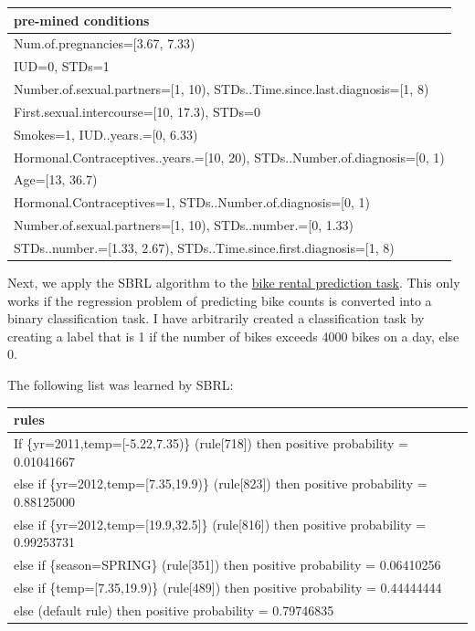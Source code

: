 \documentclass[
  11pt,
]{scrbook}
\begin{document}
\begin{table}
\centering
\begin{tabular}{>{\raggedright\arraybackslash}p{10cm}}
\toprule
pre-mined conditions\\
\midrule
Num.of.pregnancies=[3.67, 7.33)\\
IUD=0, STDs=1\\
Number.of.sexual.partners=[1, 10), STDs..Time.since.last.diagnosis=[1, 8)\\
First.sexual.intercourse=[10, 17.3), STDs=0\\
Smokes=1, IUD..years.=[0, 6.33)\\
\addlinespace
Hormonal.Contraceptives..years.=[10, 20), STDs..Number.of.diagnosis=[0, 1)\\
Age=[13, 36.7)\\
Hormonal.Contraceptives=1, STDs..Number.of.diagnosis=[0, 1)\\
Number.of.sexual.partners=[1, 10), STDs..number.=[0, 1.33)\\
STDs..number.=[1.33, 2.67), STDs..Time.since.first.diagnosis=[1, 8)\\
\bottomrule
\end{tabular}
\end{table}

Next, we apply the SBRL algorithm to the \protect\hyperlink{bike-data}{bike rental prediction task}.
This only works if the regression problem of predicting bike counts is converted into a binary classification task.
I have arbitrarily created a classification task by creating a label that is 1 if the number of bikes exceeds 4000 bikes on a day, else 0.

The following list was learned by SBRL:

\begin{table}
\centering
\begin{tabular}{>{\raggedright\arraybackslash}p{10cm}}
\toprule
rules\\
\midrule
If      \{yr=2011,temp=[-5.22,7.35)\} (rule[718]) then positive probability = 0.01041667\\
else if \{yr=2012,temp=[7.35,19.9)\} (rule[823]) then positive probability = 0.88125000\\
else if \{yr=2012,temp=[19.9,32.5]\} (rule[816]) then positive probability = 0.99253731\\
else if \{season=SPRING\} (rule[351]) then positive probability = 0.06410256\\
else if \{temp=[7.35,19.9)\} (rule[489]) then positive probability = 0.44444444\\
\addlinespace
else  (default rule)  then positive probability = 0.79746835\\
\bottomrule
\end{tabular}
\end{table}
\end{document}
